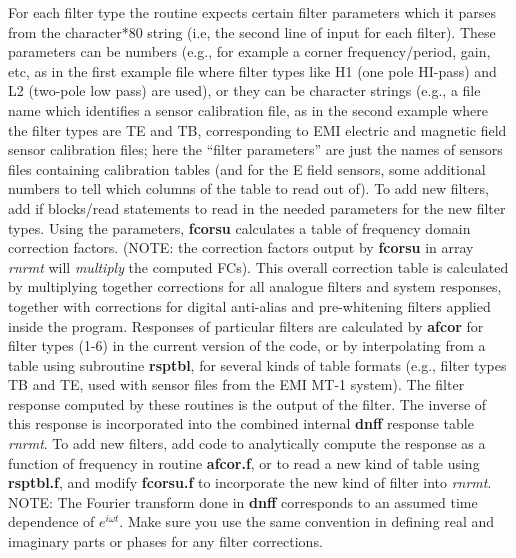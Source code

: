 For each filter type the routine expects certain filter
parameters which it parses from the character*80
string (i.e, the second line of input
for each filter).  These parameters can be numbers (e.g., for
example a corner frequency/period, gain, etc, as in the first example
file where filter types like H1 (one pole HI-pass) and L2 (two-pole low pass)
are used),
or they can be character strings (e.g., a file name which identifies
a sensor calibration file, as in the second example where the filter
types are TE and TB, corresponding to EMI electric and magnetic
field sensor calibration files;  here the ``filter parameters''
are just the names of sensors files containing calibration tables
(and for the E field sensors, some additional numbers to tell which
columns of the table to read out of).
To add new filters, add if blocks/read statements
to read in the needed parameters for the new filter types.
Using the parameters, {\bf fcorsu }calculates a table of
frequency domain correction factors.
(NOTE: the correction factors output by {\bf fcorsu}
in array {\it rnrmt} will {\it multiply} the computed FCs).
This overall correction table is calculated by multiplying together 
corrections for all analogue filters and system responses, together
with corrections for
digital anti-alias and pre-whitening filters applied inside the
program.
Responses of particular filters are calculated by {\bf afcor}
for filter types (1-6) in the current version of the code,
or by interpolating from a table using
subroutine {\bf rsptbl}, for several kinds of 
table formats (e.g., filter types TB and TE,
used with sensor files from the EMI MT-1 system).
The filter response computed by these routines is the output of
the filter.  The inverse of this response is incorporated into
the combined internal {\bf dnff} response table {\it rnrmt}.
To add new filters, add code to
analytically compute the response as a function of frequency
in routine {\bf afcor.f}, or to read a new kind of table
using {\bf rsptbl.f}, and modify {\bf fcorsu.f} to incorporate
the new kind of filter into {\it rnrmt}.
NOTE: The Fourier transform done in {\bf dnff} corresponds to
an assumed time dependence of $e^{i \omega t}$.  Make sure
you use the same convention in defining real and imaginary parts
or phases for any filter corrections.

